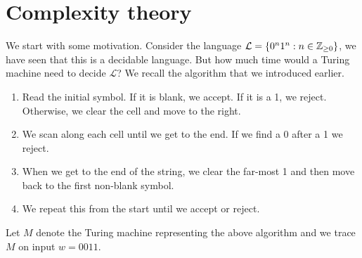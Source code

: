 \section{Complexity theory}

We start with some motivation. Consider the language $\mathcal L = \{0^n1^n: n \in \mathbb Z_{\geq 0}\}$, we have seen that this is a decidable language. But how much time would a Turing machine need to decide $\mathcal L$? We recall the algorithm that we introduced earlier.

\begin{enumerate}
  \item Read the initial symbol. If it is blank, we accept. If it is a 1, we reject. Otherwise, we clear the cell and move to the right.
  \item We scan along each cell until we get to the end. If we find a 0 after a 1 we reject.
  \item When we get to the end of the string, we clear the far-most 1 and then move back to the first non-blank symbol.
  \item We repeat this from the start until we accept or reject.
\end{enumerate}

Let $M$ denote the Turing machine representing the above algorithm and we trace $M$ on input $w = 0011$.

